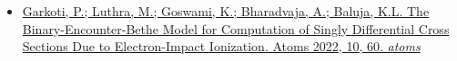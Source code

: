 \begin{itemize}
    \item \href{https://doi.org/10.3390/atoms10020060}{%
    Garkoti, P.; Luthra, M.; Goswami, K.; Bharadvaja, A.; Baluja, K.L. The Binary-Encounter-Bethe Model for Computation of Singly Differential Cross Sections Due to Electron-Impact Ionization. Atoms 2022, 10, 60. \emph{atoms}
    } \\
\end{itemize}
